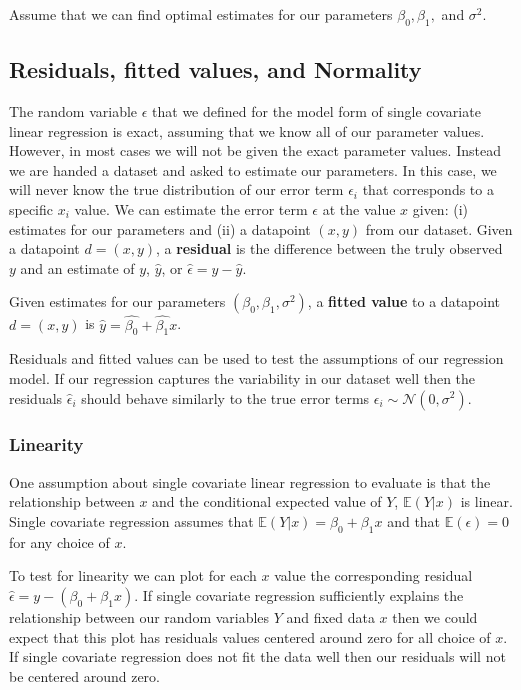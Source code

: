 Assume that we can find optimal estimates for our parameters $\beta_{0}, \beta_{1},$ and $\sigma^{2}$. 

\subsection{Residuals, fitted values, and Normality}

The random variable $\epsilon$ that we defined for the model form of single covariate linear regression is exact, assuming that we know all of our parameter values.
However, in most cases we will not be given the exact parameter values. 
Instead we are handed a dataset and asked to estimate our parameters.
In this case, we will never know the true distribution of our error term $\epsilon_{i}$ that corresponds to a specific $x_{i}$ value. 
We can estimate the error term $\epsilon$ at the value $x$ given: (i) estimates for our parameters and (ii) a datapoint $(x, y)$ from our dataset. 
Given a datapoint $d = (x,y)$, a \textbf{residual} is the difference between the truly observed $y$ and an estimate of $y$, $\hat{y}$, or $\hat{\epsilon} = y - \hat{y}$.

Given estimates for our parameters $(\beta_{0}, \beta_{1}, \sigma^{2})$, a \textbf{fitted value} to a datapoint $d = (x,y)$ is $\hat{y} = \hat{\beta_{0}} + \hat{\beta_{1}} x $.

Residuals and fitted values can be used to test the assumptions of our regression model. 
If our regression captures the variability in our dataset well then the residuals $\hat{\epsilon}_{i}$ should behave similarly to the true error terms $\epsilon_{i} \sim \mathcal{N}(0,\sigma^{2})$. 

\subsubsection{Linearity}

One assumption about single covariate linear regression to evaluate is that the relationship between $x$ and the conditional expected value of $Y$, $\mathbb{E}(Y|x)$ is linear.
Single covariate regression assumes that $\mathbb{E}(Y|x) = \beta_{0} + \beta_{1} x$ and that $\mathbb{E}(\epsilon) = 0$ for any choice of $x$.

To test for linearity we can plot for each $x$ value the corresponding residual $\hat{\epsilon} = y - (\beta_{0} + \beta_{1} x)$.
If single covariate regression sufficiently explains the relationship between our random variables $Y$ and fixed data $x$ then we could expect that this plot has residuals values centered around zero for all choice of $x$.
If single covariate regression does not fit the data well then our residuals will not be centered around zero.

